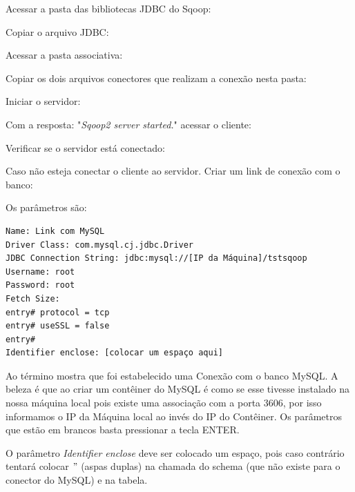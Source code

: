 \documentclass[a4paper,11pt]{article}
\begin{document}
Acessar a pasta das bibliotecas JDBC do Sqoop: \\

Copiar o arquivo JDBC: \\

Acessar a pasta associativa: \\

Copiar os dois arquivos conectores que realizam a conexão nesta pasta: \\

Iniciar o servidor: \\

Com a resposta: "\textit{Sqoop2 server started.}" acessar o cliente: \\

Verificar se o servidor está conectado: \\

Caso não esteja conectar o cliente ao servidor. Criar um link de conexão com o banco: \\

Os parâmetros são:
\begin{lstlisting}[]
Name: Link com MySQL
Driver Class: com.mysql.cj.jdbc.Driver
JDBC Connection String: jdbc:mysql://[IP da Máquina]/tstsqoop
Username: root
Password: root
Fetch Size:
entry# protocol = tcp
entry# useSSL = false
entry# 
Identifier enclose: [colocar um espaço aqui]
\end{lstlisting}

Ao término mostra que foi estabelecido uma Conexão com o banco MySQL. A beleza é que ao criar um contêiner do MySQL é como se esse tivesse instalado na nossa máquina local pois existe uma associação com a porta 3606, por isso informamos o IP da Máquina local ao invés do IP do Contêiner. Os parâmetros que estão em brancos basta pressionar a tecla ENTER.

O parâmetro \textit{Identifier enclose} deve ser colocado um espaço, pois caso contrário tentará colocar $"$ (aspas duplas) na chamada do schema (que não existe para o conector do MySQL) e na tabela.
\end{document}

